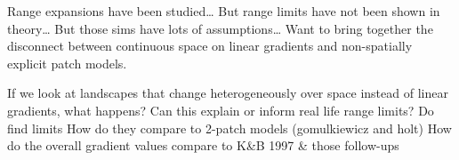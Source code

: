 


Range expansions have been studied…
But range limits have not been shown in theory…
But those sims have lots of assumptions…
Want to bring together the disconnect between continuous space on linear gradients and 
non-spatially explicit patch models.

If we look at landscapes that change heterogeneously over space instead of linear gradients, 
what happens? Can this explain or inform real life range limits?
Do find limits
	How do they compare to 2-patch models (gomulkiewicz and holt)
	How do the overall gradient values compare to K\&B 1997 \& those follow-ups


